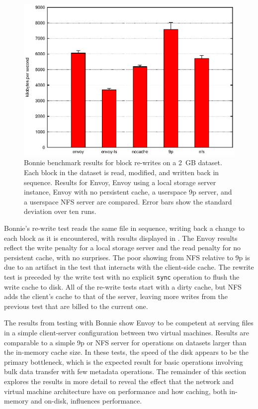 \begin{figure}[t]
\centering
\includegraphics[width=\figwidth]{figures/bonnie-druid1-rewrite}
\caption[Bonnie benchmark results for block re-writes]{Bonnie benchmark results for block re-writes on a 2~GB dataset. Each block in the dataset is read, modified, and written back in sequence. Results for Envoy, Envoy using a local storage server instance, Envoy with no persistent cache, a userspace 9p server, and a userspace NFS server are compared. Error bars show the standard deviation over ten runs.}
\label{fig:bonnie-druid1-rewrite}
\end{figure}

Bonnie's re-write test reads the same file in sequence, writing back a change to each block as it is encountered, with results displayed in . The Envoy results reflect the write penalty for a local storage server and the read penalty for no persistent cache, with no surprises. The poor showing from NFS relative to 9p is due to an artifact in the test that interacts with the client-side cache. The rewrite test is preceded by the write test with no explicit \texttt{sync} operation to flush the write cache to disk. All of the re-write tests start with a dirty cache, but NFS adds the client's cache to that of the server, leaving more writes from the previous test that are billed to the current one.

The results from testing with Bonnie show Envoy to be competent at serving files in a simple client-server configuration between two virtual machines. Results are comparable to a simple 9p or NFS server for operations on datasets larger than the in-memory cache size. In these tests, the speed of the disk appears to be the primary bottleneck, which is the expected result for basic operations involving bulk data transfer with few metadata operations. The remainder of this section explores the results in more detail to reveal the effect that the network and virtual machine architecture have on performance and how caching, both in-memory and on-disk, influences performance.

